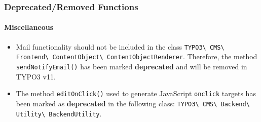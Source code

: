 \begin{frame}[fragile]
	\frametitle{Deprecated/Removed Functions}
	\framesubtitle{Miscellaneous}

	\begin{itemize}
		\item Mail functionality should not be included in the class\newline
			\small
				\texttt{TYPO3\textbackslash
					CMS\textbackslash
					Frontend\textbackslash
					ContentObject\textbackslash
					ContentObjectRenderer}.\newline
			\normalsize
			Therefore, the method \texttt{sendNotifyEmail()} has been marked \textbf{deprecated} and will be removed in TYPO3 v11.

		\item The method \texttt{editOnClick()} used to generate JavaScript \texttt{onclick}
			targets has been marked as \textbf{deprecated} in the following class:\newline
			\small
				\texttt{TYPO3\textbackslash
					CMS\textbackslash
					Backend\textbackslash
					Utility\textbackslash
					BackendUtility}.
			\normalsize

	\end{itemize}

\end{frame}


